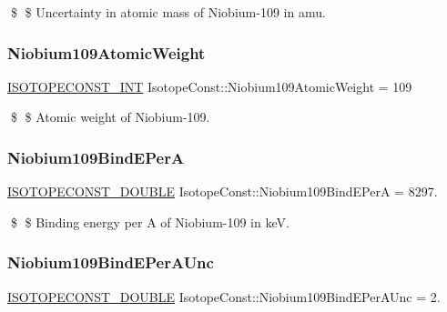 \$ \$ Uncertainty in atomic mass of Niobium-\/109 in amu. \mbox{\label{group___isotope_const-_niobium-_nb109_ga9fedd3b791d9864b5e30d8f39abb6da5}} 
\subsubsection{\texorpdfstring{Niobium109\+Atomic\+Weight}{Niobium109AtomicWeight}}
{\footnotesize\ttfamily \mbox{\hyperlink{group___isotope_const-_macros_ga5f18360b3e99483a35c32d789e62621c}{I\+S\+O\+T\+O\+P\+E\+C\+O\+N\+S\+T\+\_\+\+I\+NT}} Isotope\+Const\+::\+Niobium109\+Atomic\+Weight = 109}

\$ \$ Atomic weight of Niobium-\/109. \mbox{\label{group___isotope_const-_niobium-_nb109_ga748e2c4e5073587566ef9dd81f6c79b8}} 
\subsubsection{\texorpdfstring{Niobium109\+Bind\+E\+PerA}{Niobium109BindEPerA}}
{\footnotesize\ttfamily \mbox{\hyperlink{group___isotope_const-_macros_ga8f45a7272ce02c0b4c65c44636ed719a}{I\+S\+O\+T\+O\+P\+E\+C\+O\+N\+S\+T\+\_\+\+D\+O\+U\+B\+LE}} Isotope\+Const\+::\+Niobium109\+Bind\+E\+PerA = 8297.}

\$ \$ Binding energy per A of Niobium-\/109 in keV. \mbox{\label{group___isotope_const-_niobium-_nb109_ga3e74b8f41812502adce0f1e480c73051}} 
\subsubsection{\texorpdfstring{Niobium109\+Bind\+E\+Per\+A\+Unc}{Niobium109BindEPerAUnc}}
{\footnotesize\ttfamily \mbox{\hyperlink{group___isotope_const-_macros_ga8f45a7272ce02c0b4c65c44636ed719a}{I\+S\+O\+T\+O\+P\+E\+C\+O\+N\+S\+T\+\_\+\+D\+O\+U\+B\+LE}} Isotope\+Const\+::\+Niobium109\+Bind\+E\+Per\+A\+Unc = 2.}

